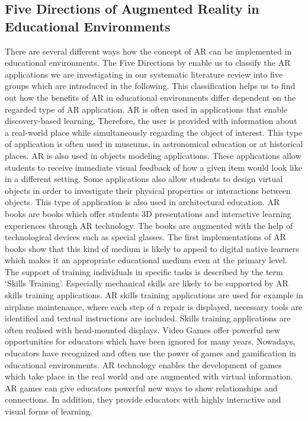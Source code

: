 \subsection[Five Directions of Augmented Reality in Educational Environments]{Five Directions of Augmented Reality in Educational Environments\autocite[\label{fn:Yuen_2011_126_130}cf.][126-130]{Yuen.2011}}
\label{subsec:FiveDirections}
There are several different ways how the concept of AR can be implemented in educational environments.\mulcit\autocite[cf.][14-18]{Lee.2012} The Five Directions by \cite{Yuen.2011} enable us to classify the AR applications we are investigating in our systematic literature review into five groups which are introduced in the following. This classification helps us to find out how the benefits of AR in educational environments differ dependent on the regarded type of AR application.
\heading{\DBL}
AR is often used in applications that enable discovery-based learning. Therefore, the user is provided with information about a real-world place while simultaneously regarding the object of interest. This type of application is often used in museums, in astronomical education or at historical places.
\heading{\OM}
AR is also used in objects modeling applications. These applications allow students to receive immediate visual feedback of how a given item would look like in a different setting. Some applications also allow students to design virtual objects in order to investigate their physical properties or interactions between objects. This type of application is also used in architectural education.
\heading{\ARB}
AR books are books which offer students 3D presentations and interactive learning experiences through AR technology. The books are augmented with the help of technological devices such as special glasses. The first implementations of AR books show that this kind of medium is likely to appeal to digital native learners which makes it an appropriate educational medium even at the primary level.
\heading{\ST}
The support of training individuals in specific tasks is described by the term ‘Skills Training’. Especially mechanical skills are likely to be supported by AR skills training applications. AR skills training applications are used for example in airplane maintenance, where each step of a repair is displayed, necessary tools are identified and textual instructions are included. Skills training applications are often realised with head-mounted displays. 
\heading{\ARG}
Video Games offer powerful new opportunities for educators which have been ignored for many years. \autocite[cf.][2]{Squire.2003} %
Nowadays, educators have recognized and often use the power of games and gamification in educational environments. AR technology enables the development of games which take place in the real world and are augmented with virtual information. AR games can give educators powerful new ways to show relationships and connections. In addition, they provide educators with highly interactive and visual forms of learning.